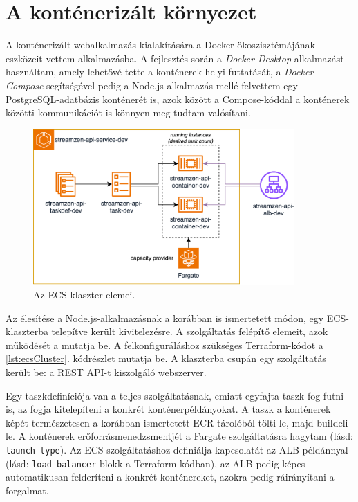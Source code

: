 \section{A konténerizált környezet}

A konténerizált webalkalmazás kialakítására a Docker ökoszisztémájának eszközeit vettem alkalmazásba. A fejlesztés során a \emph{Docker Desktop} alkalmazást használtam, amely lehetővé tette a konténerek helyi futtatását, a \emph{Docker Compose} segítségével pedig a Node.js-alkalmazás mellé felvettem egy PostgreSQL-adatbázis konténerét is, azok között a Compose-kóddal a konténerek közötti kommunikációt is könnyen meg tudtam valósítani.

\begin{figure}[h]
  \centering
  \includegraphics[width=100mm, keepaspectratio]{figures/dipterv_ecs.png}
  \caption{Az ECS-klaszter elemei.}
  \label{fig:ecscluster}
\end{figure}

Az élesítése a Node.js-alkalmazásnak a korábban is ismertetett módon, egy ECS-klaszterba telepítve került kivitelezésre. A szolgáltatás felépítő elemeit, azok működését a  mutatja be. A felkonfiguráláshoz szükséges Terraform-kódot a \ref{lst:ecsCluster}. kódrészlet mutatja be. A klaszterba csupán egy szolgáltatás került be: a REST API-t kiszolgáló webszerver.

Egy taszkdefiníciója van a teljes szolgáltatásnak, emiatt egyfajta taszk fog futni is, az fogja kitelepíteni a konkrét konténerpéldányokat. A taszk a konténerek képét természetesen a korábban ismertetett ECR-tárolóból tölti le, majd buildeli le. A konténerek erőforrásmenedzsmentjét a Fargate szolgáltatásra hagytam (lásd: \verb|launch type|). Az ECS-szolgáltatáshoz definiálja kapcsolatát az ALB-példánnyal (lásd: \verb|load balancer| blokk a Terraform-kódban), az ALB pedig képes automatikusan felderíteni a konkrét konténereket, azokra pedig ráirányítani a forgalmat.

